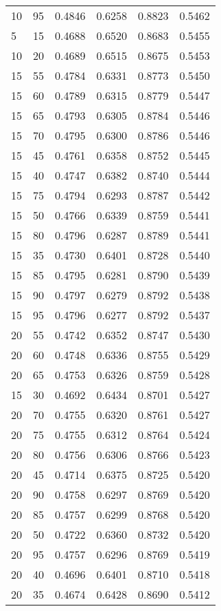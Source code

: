 \begin{center}
\begin{longtable}{|l|l|l|l|l|l|}
10 & 95 & 0.4846 & 0.6258 & 0.8823 & 0.5462 \\
5  & 15 & 0.4688 & 0.6520 & 0.8683 & 0.5455 \\
10 & 20 & 0.4689 & 0.6515 & 0.8675 & 0.5453 \\
15 & 55 & 0.4784 & 0.6331 & 0.8773 & 0.5450 \\
15 & 60 & 0.4789 & 0.6315 & 0.8779 & 0.5447 \\
15 & 65 & 0.4793 & 0.6305 & 0.8784 & 0.5446 \\
15 & 70 & 0.4795 & 0.6300 & 0.8786 & 0.5446 \\
15 & 45 & 0.4761 & 0.6358 & 0.8752 & 0.5445 \\
15 & 40 & 0.4747 & 0.6382 & 0.8740 & 0.5444 \\
15 & 75 & 0.4794 & 0.6293 & 0.8787 & 0.5442 \\
15 & 50 & 0.4766 & 0.6339 & 0.8759 & 0.5441 \\
15 & 80 & 0.4796 & 0.6287 & 0.8789 & 0.5441 \\
15 & 35 & 0.4730 & 0.6401 & 0.8728 & 0.5440 \\
15 & 85 & 0.4795 & 0.6281 & 0.8790 & 0.5439 \\
15 & 90 & 0.4797 & 0.6279 & 0.8792 & 0.5438 \\
15 & 95 & 0.4796 & 0.6277 & 0.8792 & 0.5437 \\
20 & 55 & 0.4742 & 0.6352 & 0.8747 & 0.5430 \\
20 & 60 & 0.4748 & 0.6336 & 0.8755 & 0.5429 \\
20 & 65 & 0.4753 & 0.6326 & 0.8759 & 0.5428 \\
15 & 30 & 0.4692 & 0.6434 & 0.8701 & 0.5427 \\
20 & 70 & 0.4755 & 0.6320 & 0.8761 & 0.5427 \\
20 & 75 & 0.4755 & 0.6312 & 0.8764 & 0.5424 \\
20 & 80 & 0.4756 & 0.6306 & 0.8766 & 0.5423 \\
20 & 45 & 0.4714 & 0.6375 & 0.8725 & 0.5420 \\
20 & 90 & 0.4758 & 0.6297 & 0.8769 & 0.5420 \\
20 & 85 & 0.4757 & 0.6299 & 0.8768 & 0.5420 \\
20 & 50 & 0.4722 & 0.6360 & 0.8732 & 0.5420 \\
20 & 95 & 0.4757 & 0.6296 & 0.8769 & 0.5419 \\
20 & 40 & 0.4696 & 0.6401 & 0.8710 & 0.5418 \\
20 & 35 & 0.4674 & 0.6428 & 0.8690 & 0.5412 \\

\end{longtable}
\end{center}
